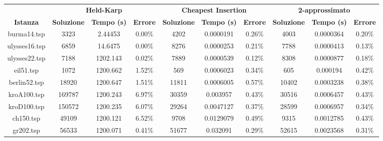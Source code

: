 \begin{longtable}{|c|c|c|c|c|c|c|c|c|c|}
\hline
\textbf{}        & \multicolumn{3}{c|}{\textbf{Held-Karp}}                   & \multicolumn{3}{c|}{\textbf{Cheapest Insertion}}          & \multicolumn{3}{c|}{\textbf{2-approssimato}}              \\ \cline{2-10} 
\textbf{Istanza} & \textbf{Soluzione} & \textbf{Tempo (s)} & \textbf{Errore} & \textbf{Soluzione} & \textbf{Tempo (s)} & \textbf{Errore} & \textbf{Soluzione} & \textbf{Tempo (s)} & \textbf{Errore} \\ \hline
burma14.tsp      & 3323               & 2.44453            & 0.00\%          & 4202               & 0.0000191          & 0.26\%          & 4003               & 0.0000364          & 0.20\%          \\ \hline
ulysses16.tsp    & 6859               & 14.6475            & 0.00\%          & 8276               & 0.0000253          & 0.21\%          & 7788               & 0.0000413          & 0.13\%          \\ \hline
ulysses22.tsp    & 7188               & 1202.143           & 0.02\%          & 7889               & 0.0000539          & 0.12\%          & 8308               & 0.0000877          & 0.18\%          \\ \hline
eil51.tsp        & 1072               & 1200.662           & 1.52\%          & 569                & 0.0006023          & 0.34\%          & 605                & 0.000194           & 0.42\%          \\ \hline
berlin52.tsp     & 18920              & 1200.647           & 1.51\%          & 11811              & 0.0006005          & 0.57\%          & 10402              & 0.0003238          & 0.38\%          \\ \hline
kroA100.tsp      & 169787             & 1200.243           & 6.97\%          & 30359              & 0.003957           & 0.43\%          & 30516              & 0.0006457          & 0.43\%          \\ \hline
kroD100.tsp      & 150572             & 1200.235           & 6.07\%          & 29264              & 0.0047127          & 0.37\%          & 28599              & 0.0006957          & 0.34\%          \\ \hline
ch150.tsp        & 49109              & 1200.121           & 6.52\%          & 9708               & 0.0129079          & 0.49\%          & 9315               & 0.0012785          & 0.43\%          \\ \hline
gr202.tsp        & 56533              & 1200.071           & 0.41\%          & 51677              & 0.032091           & 0.29\%          & 52615              & 0.0023568          & 0.31\%          \\ \hline

\end{longtable}
